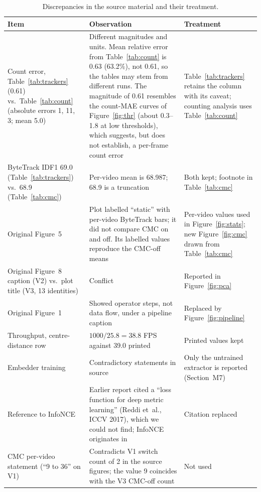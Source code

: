 \documentclass[11pt,a4paper]{article}
\begin{document}
\begin{table}[t]
\caption{Discrepancies in the source material and their treatment.}\label{tab:disc}
\centering\footnotesize
\begin{tabular}{p{4.2cm}p{5.2cm}p{4.5cm}}
\toprule
Item & Observation & Treatment\\
\midrule
Count error, Table~\ref{tab:trackers} (0.61) vs.\ Table~\ref{tab:count} (absolute errors 1, 11, 3; mean 5.0) & Different magnitudes and units. Mean relative error from Table~\ref{tab:count} is 0.63 (63.2\%), not 0.61, so the tables may stem from different runs. The magnitude of 0.61 resembles the count-MAE curves of Figure~\ref{fig:thr} (about 0.3--1.8 at low thresholds), which suggests, but does not establish, a per-frame count error & Table~\ref{tab:trackers} retains the column with its caveat; counting analysis uses Table~\ref{tab:count}\\
ByteTrack IDF1 69.0 (Table~\ref{tab:trackers}) vs.\ 68.9 (Table~\ref{tab:cmc}) & Per-video mean is 68.987; 68.9 is a truncation & Both kept; footnote in Table~\ref{tab:cmc}\\
Original Figure~5 & Plot labelled ``static'' with per-video ByteTrack bars; it did not compare CMC on and off. Its labelled values reproduce the CMC-off means & Per-video values used in Figure~\ref{fig:stats}; new Figure~\ref{fig:cmc} drawn from Table~\ref{tab:cmc}\\
Original Figure~8 caption (V2) vs.\ plot title (V3, 13 identities) & Conflict & Reported in Figure~\ref{fig:pca}\\
Original Figure~1 & Showed operator steps, not data flow, under a pipeline caption & Replaced by Figure~\ref{fig:pipeline}\\
Throughput, centre-distance row & $1000/25.8=38.8$ FPS against 39.0 printed & Printed values kept\\
Embedder training & Contradictory statements in source & Only the untrained extractor is reported (Section~M7)\\
Reference to InfoNCE & Earlier report cited a ``loss function for deep metric learning'' (Reddi et~al., ICCV 2017), which we could not find; InfoNCE originates in~\cite{oord2018cpc} & Citation replaced\\
CMC per-video statement (``9 to 36'' on V1) & Contradicts V1 switch count of 2 in the source figures; the value 9 coincides with the V3 CMC-off count & Not used\\
\bottomrule
\end{tabular}
\end{table}
\end{document}
